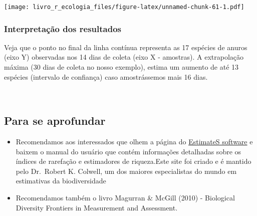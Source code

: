 \documentclass[
]{book}
\begin{document}
\texttt{[image: livro\_r\_ecologia\_files/figure-latex/unnamed-chunk-61-1.pdf]}

\hypertarget{interpretauxe7uxe3o-dos-resultados-7}{%
\subsubsection{Interpretação dos resultados}\label{interpretauxe7uxe3o-dos-resultados-7}}

Veja que o ponto no final da linha contínua representa as 17 espécies de anuros (eixo Y) observadas nos 14 dias de coleta (eixo X - amostras). A extrapolação máxima (30 dias de coleta no nosso exemplo), estima um aumento de até 13 espécies (intervalo de confiança) caso amostrássemos mais 16 dias.

~

\hypertarget{para-se-aprofundar}{%
\subsection{Para se aprofundar}\label{para-se-aprofundar}}

\begin{itemize}
\item
  Recomendamos aos interessados que olhem a página do \href{http://viceroy.eeb.uconn.edu/estimates}{EstimateS software} e baixem o manual do usuário que contém informações detalhadas sobre os índices de rarefação e estimadores de riqueza.Este site foi criado e é mantido pelo Dr.~Robert K. Colwell, um dos maiores especialistas do mundo em estimativas da biodiversidade
\item
  Recomendamos também o livro Magurran \& McGill (2010) - Biological Diversity Frontiers in Measurement and Assessment.
\end{itemize}

  
\end{document}
